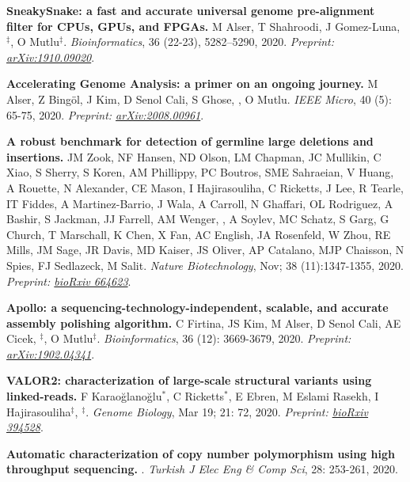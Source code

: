\vspace{-.2cm}
    {\bf SneakySnake: a fast and accurate universal genome pre-alignment filter for CPUs, GPUs, and FPGAs.} M Alser, T Shahroodi, J Gomez-Luna, \calkan{}$^\ddag$, O Mutlu$^\ddag$. {\it Bioinformatics}, 36 (22-23), 5282–5290, 2020. \textit{Preprint: \href{https://doi.org/10.48550/arXiv.1910.09020}{arXiv:1910.09020}}.

\vspace{-.2cm}
    {\bf Accelerating Genome Analysis: a primer on an ongoing journey.} M Alser, Z Bingöl, J Kim, D Senol Cali, S Ghose, \calkan{}, O Mutlu. {\it IEEE Micro}, 40 (5): 65-75, 2020. \textit{Preprint: \href{https://doi.org/10.48550/arXiv.2008.00961}{arXiv:2008.00961}}.
    
\vspace{-.2cm}
    {\bf A robust benchmark for detection of germline large deletions and insertions.}
    JM Zook, NF Hansen, ND Olson, LM Chapman, JC Mullikin, C Xiao, S Sherry, S Koren, AM Phillippy, PC Boutros, SME Sahraeian, V Huang, A Rouette, N Alexander, CE Mason, I Hajirasouliha, C Ricketts, J Lee, R Tearle, IT Fiddes, A Martinez-Barrio, J Wala, A Carroll, N Ghaffari, OL Rodriguez, A Bashir, S Jackman, JJ Farrell, AM Wenger, \calkan{}, A Soylev, MC Schatz, S Garg, G Church, T Marschall, K Chen, X Fan, AC English, JA Rosenfeld, W Zhou, RE Mills, JM Sage, JR Davis, MD Kaiser, JS Oliver, AP Catalano, MJP Chaisson, N Spies, FJ Sedlazeck, M Salit.
    {\it Nature Biotechnology}, Nov; 38 (11):1347-1355, 2020. \textit{Preprint: \href{https://doi.org/10.1101/664623}{bioRxiv 664623}}.

\vspace{-.2cm}
    {\bf Apollo: a sequencing-technology-independent, scalable, and accurate assembly polishing algorithm.} C Firtina, JS Kim, M Alser, D Senol Cali, AE Cicek, \calkan{}$^\ddag$, O Mutlu$^\ddag$. {\it Bioinformatics}, 36 (12): 3669-3679, 2020.
    \textit{Preprint: \href{https://doi.org/10.48550/arXiv.1902.04341}{arXiv:1902.04341}}.

\vspace{-.2cm}
    {\bf VALOR2: characterization of large-scale structural variants using linked-reads.}
    F Karaoğlanoğlu$^\ast$, C Ricketts$^\ast$, E Ebren, M Eslami Rasekh, I Hajirasouliha$^\ddag$, \calkan{}$^\ddag$. {\it Genome Biology}, Mar 19; 21: 72, 2020. \textit{Preprint: \href{https://doi.org/10.1101/394528}{bioRxiv 394528}}.
    
\vspace{-.2cm}
    {\bf Automatic characterization of copy number polymorphism using high throughput sequencing.}  \calkan{}. {\em Turkish J Elec Eng \& Comp Sci}, 28: 253-261, 2020.
         
